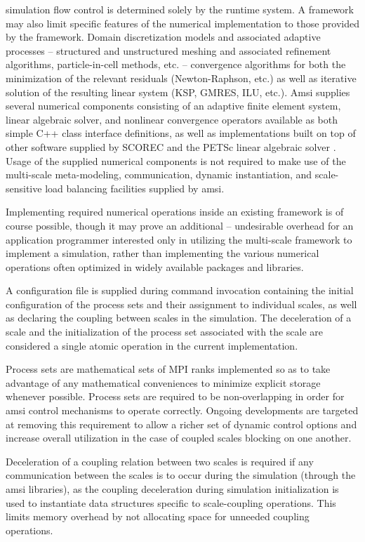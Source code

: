 \documentclass[11pt]{siamltex1213}
\begin{document}
simulation flow control is determined solely by the runtime system. A framework may also limit specific features of the numerical implementation to those provided by the framework. Domain discretization models and associated adaptive processes -- structured and unstructured meshing and associated refinement algorithms, particle-in-cell methods, etc. -- convergence algorithms for both the minimization of the relevant residuals (Newton-Raphson, etc.) as well as iterative solution of the resulting linear system (KSP, GMRES, ILU, etc.). Amsi supplies several numerical components consisting of an adaptive finite element system, linear algebraic solver, and nonlinear convergence operators available as both simple C++ class interface definitions, as well as implementations built on top of other software supplied by SCOREC \cite{core} and the PETSc linear algebraic solver \cite{petsc-web-page} \cite{petsc-user-ref} \cite{petsc-efficient}. Usage of the supplied numerical components is not required to make use of the multi-scale meta-modeling, communication, dynamic instantiation, and scale-sensitive load balancing facilities supplied by amsi.

Implementing required numerical operations inside an existing framework is of course possible, though it may prove an additional -- undesirable overhead for an application programmer interested only in utilizing the multi-scale framework to implement a simulation, rather than implementing the various numerical operations often optimized in widely available packages and libraries.

\label{amsi_scales}
A configuration file is supplied during command invocation containing the initial configuration of the process sets and their assignment to individual scales, as well as declaring the coupling between scales in the simulation. The deceleration of a scale and the initialization of the process set associated with the scale are considered a single atomic operation in the current implementation.

Process sets are mathematical sets of MPI ranks implemented so as to take advantage of any mathematical conveniences to minimize explicit storage whenever possible. Process sets are required to be non-overlapping in order for amsi control mechanisms to operate correctly. Ongoing developments are targeted at removing this requirement to allow a richer set of dynamic control options and increase overall utilization in the case of coupled scales blocking on one another. 

Deceleration of a coupling relation between two scales is required if any communication between the scales is to occur during the simulation (through the amsi libraries), as the coupling deceleration during simulation initialization is used to instantiate data structures specific to scale-coupling operations. This limits memory overhead by not allocating space for unneeded coupling operations.
\end{document}
